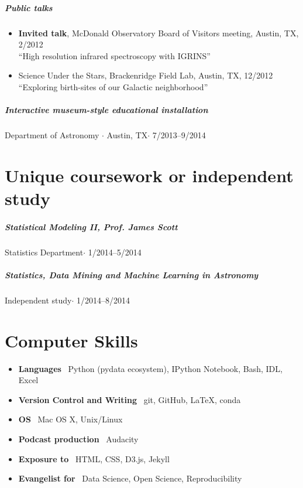 \documentclass[10pt,letterpaper]{article}
\begin{document}
\subparagraph{Public talks}
	\begin{itemize}
	    \item \textbf{Invited talk}, McDonald Observatory Board of Visitors meeting, Austin, TX, 2/2012 \\
	    ``High resolution infrared spectroscopy with IGRINS'' 
	    \item Science Under the Stars, Brackenridge Field Lab, Austin, TX, 12/2012 \\
	    ``Exploring birth-sites of our Galactic neighborhood'' 
	\end{itemize}

\subparagraph{Interactive museum-style educational installation}
Department of Astronomy $\cdot$ Austin, TX$\cdot$ 7/2013--9/2014

\section*{Unique coursework or independent study}

\subparagraph{Statistical Modeling II, Prof. James Scott}
Statistics Department$\cdot$ 1/2014--5/2014

\subparagraph{Statistics, Data Mining and Machine Learning in Astronomy}
Independent study$\cdot$ 1/2014--8/2014

	
\section*{Computer Skills}

\begin{itemize}
    \item \textbf{Languages} \ Python (pydata ecosystem), IPython Notebook, Bash, IDL, Excel
    \item \textbf{Version Control and Writing} \ git, GitHub, \LaTeX, conda
    \item \textbf{OS} \ Mac OS X, Unix/Linux
    \item \textbf{Podcast production} \ Audacity
    \item \textbf{Exposure to} \ HTML, CSS, D3.js, Jekyll
    \item \textbf{Evangelist for} \ Data Science, Open Science, Reproducibility
\end{itemize}
\end{document}
